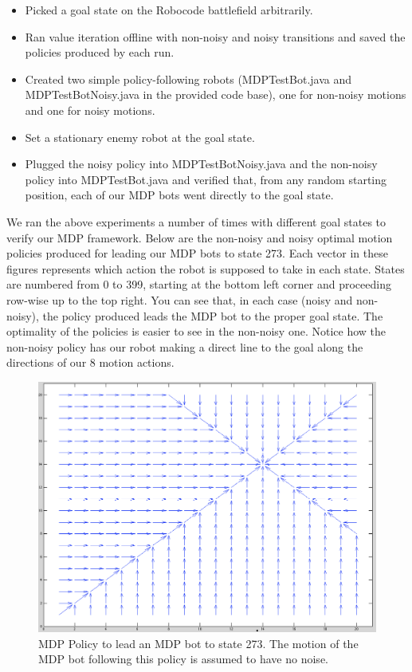 \documentclass{aiaa-tc}%
\begin{document}
\begin{itemize}
\item Picked a goal state on the Robocode battlefield arbitrarily.
\item Ran value iteration offline with non-noisy and noisy transitions and saved the policies produced by each run.
\item Created two simple policy-following robots (MDPTestBot.java and MDPTestBotNoisy.java in the provided code base), one for non-noisy motions and one for noisy motions.
\item Set a stationary enemy robot at the goal state.
\item Plugged the noisy policy into MDPTestBotNoisy.java and the non-noisy policy into MDPTestBot.java and verified that, from any random starting position, each of our MDP bots went directly to the goal state. 
\end{itemize}
We ran the above experiments a number of times with different goal states to verify our MDP framework. Below are the non-noisy and noisy optimal motion policies produced for leading our MDP bots to state 273. Each vector in these figures represents which action the robot is supposed to take in each state. States are numbered from 0 to 399, starting at the bottom left corner and proceeding row-wise up to the top right. You can see that, in each case (noisy and non-noisy), the policy produced leads the MDP bot to the proper goal state. The optimality of the policies is easier to see in the non-noisy one. Notice how the non-noisy policy has our robot making a direct line to the goal along the directions of our 8 motion actions.  
\begin{figure}[htbp]
   \centering
   \includegraphics[width=170mm]{mdp_policy_to_state_273.png} 
   \caption{MDP Policy to lead an MDP bot to state 273. The motion of the MDP bot following this policy is assumed to have no noise.}
   \label{fig:sample}
\end{figure}
\end{document}

